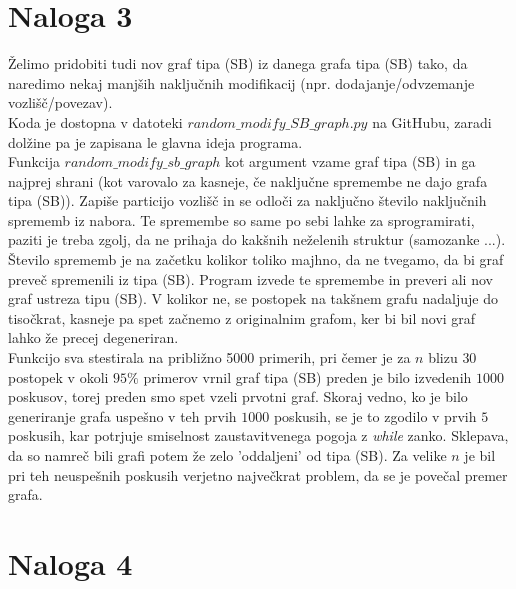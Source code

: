 \documentclass{article}
\begin{document}
\section{Naloga 3}

Želimo pridobiti tudi nov graf tipa (SB) iz danega grafa tipa (SB) tako, 
da naredimo nekaj manjših naključnih modifikacij (npr. dodajanje/odvzemanje 
vozlišč/povezav). 
\\
Koda je dostopna v datoteki $random\_modify\_SB\_graph.py$ na GitHubu, zaradi 
dolžine pa je zapisana le glavna ideja programa. 
\\Funkcija $random\_modify\_sb\_graph$ kot argument vzame graf tipa (SB) in 
ga najprej shrani (kot varovalo za kasneje, če naključne spremembe ne dajo 
grafa tipa (SB)). Zapiše particijo vozlišč in se odloči za naključno število 
naključnih sprememb iz nabora. Te spremembe so same po sebi lahke za sprogramirati, paziti 
je treba zgolj, da ne prihaja do kakšnih neželenih struktur (samozanke ...). Število sprememb je na začetku kolikor toliko majhno, da ne tvegamo,
da bi graf preveč spremenili iz tipa (SB). Program izvede te spremembe in preveri ali nov graf ustreza tipu (SB).
V kolikor ne, se postopek na takšnem grafu nadaljuje do tisočkrat, kasneje pa 
spet začnemo z originalnim grafom, ker bi bil novi graf lahko že precej degeneriran.
\\
Funkcijo sva stestirala na približno 5000 primerih, pri čemer je za $n$ blizu $30$ postopek 
v okoli $95 \%$ primerov vrnil graf tipa (SB) preden je bilo izvedenih $1000$ poskusov, torej preden smo  
spet vzeli prvotni graf. Skoraj vedno, ko je bilo generiranje grafa uspešno v teh prvih $1000$ poskusih,
se je to zgodilo v prvih $5$ poskusih, kar potrjuje smiselnost zaustavitvenega pogoja z \emph{while} zanko.
Sklepava, da so namreč bili grafi potem že zelo 'oddaljeni' od tipa (SB). Za velike $n$ je bil pri teh neuspešnih 
poskusih verjetno največkrat problem, da se je povečal premer grafa.

\section{Naloga 4}
\end{document}
